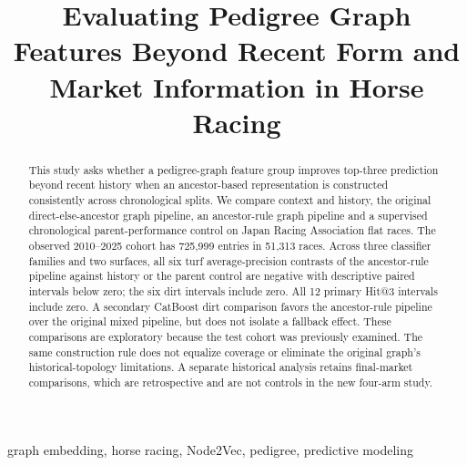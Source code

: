 \documentclass[conference,a4paper]{IEEEtran}
\begin{document}
\title{Evaluating Pedigree Graph Features Beyond Recent Form and Market Information in Horse Racing}
\author{
}
\maketitle

\begin{abstract}
This study asks whether a pedigree-graph feature group improves top-three prediction beyond recent history when an ancestor-based representation is constructed consistently across chronological splits. We compare context and history, the original direct-else-ancestor graph pipeline, an ancestor-rule graph pipeline and a supervised chronological parent-performance control on Japan Racing Association flat races. The observed 2010--2025 cohort has 725,999 entries in 51,313 races. Across three classifier families and two surfaces, all six turf average-precision contrasts of the ancestor-rule pipeline against history or the parent control are negative with descriptive paired intervals below zero; the six dirt intervals include zero. All 12 primary Hit@3 intervals include zero. A secondary CatBoost dirt comparison favors the ancestor-rule pipeline over the original mixed pipeline, but does not isolate a fallback effect. These comparisons are exploratory because the test cohort was previously examined. The same construction rule does not equalize coverage or eliminate the original graph's historical-topology limitations. A separate historical analysis retains final-market comparisons, which are retrospective and are not controls in the new four-arm study.
\end{abstract}
\begin{IEEEkeywords}
graph embedding, horse racing, Node2Vec, pedigree, predictive modeling
\end{IEEEkeywords}





\end{document}
